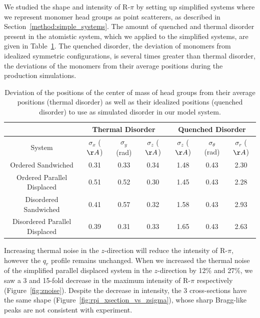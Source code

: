 \documentclass[journal=jpcbfk,manuscript=article]{achemso}
\begin{document}
  We studied the shape and intensity of R-$\pi$ by setting up simplified
  systems where we represent monomer head groups as point scatterers, as
  described in Section~\ref{method:simple_systems}. The amount of quenched and
  thermal disorder present in the atomistic system, which we applied to the
  simplified systems, are given in Table~\ref{table:quenched_disorder}. The
  quenched disorder, the deviation of monomers from idealized symmetric
  configurations, is several times greater than thermal disorder, the 
  deviations of the monomers from their average positions during the 
  production simulations.
  
  \begin{table}[h]
  \centering
  \begin{tabular}{c|ccc|ccc}
  \toprule
   		                        &           \multicolumn{3}{c}{Thermal Disorder}             &             \multicolumn{3}{c}{Quenched Disorder}               \\
  \midrule
  System                        & $\sigma_x$ ($\AA$) & $\sigma_y$ (rad) & $\sigma_z$ ($\AA$) & $\sigma_z$ ($\AA$) & $\sigma_\theta$ (rad) & $\sigma_r$ ($\AA$) \\
  \midrule
  Ordered Sandwiched            &         0.31       &       0.33       &        0.34        &        1.48        &     0.43              &     2.30           \\
  Ordered Parallel Displaced    &         0.51       &       0.52       &        0.30        &        1.45        &     0.43              &     2.28           \\ 
  Disordered Sandwiched         &         0.41       &       0.57       &        0.32        &        1.58        &     0.43              &     2.93           \\
  Disordered Parallel Displaced &         0.39       &       0.31       &        0.33        &        1.65        &     0.43              &     2.63           \\
  \bottomrule
  \end{tabular}
  \caption{Deviation of the positions of the center of mass of head groups from their average
  positions (thermal disorder) as well as their idealized positions (quenched disorder) to use 
  as simulated disorder in our model system.}
  \label{table:quenched_disorder} 
  \end{table}
  
  Increasing thermal noise in the $z$-direction will reduce the intensity
  of R-$\pi$, however the $q_r$ profile remains unchanged. When we increased the
  thermal noise of the simplified parallel displaced system in the $z$-direction by
  12\% and 27\%, we saw a 3 and 15-fold decrease in the maximum intensity of 
  R-$\pi$ respectively (Figure~\ref{fig:znoise}). Despite the decrease in 
  intensity, the 3 cross-sections have the same shape 
  (Figure~\ref{fig:rpi_xsection_vs_zsigma}), whose sharp Bragg-like peaks are
  not consistent with experiment. 
  
\end{document}
